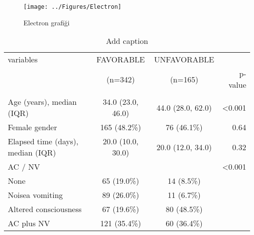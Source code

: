 \newpage
\pagestyle{fancy}
\begin{figure}[htpn]
\centering
\texttt{[image: ../Figures/Electron]}
\caption[elect2]{Electron grafiği}
\label{fig:Electr}
\end{figure}
\newpage
\pagestyle{plain}
\begin{landscape}
 \begin{table}[htbp]
   \centering
   \caption{Add caption}
     \begin{tabular}{lccr}
     	\toprule
     	variables                                     &     FAVORABLE     & UNFAVORABLE \tablefootnote{dfıjreıo} &  \\
     	                                              &      (n=342)      &               (n=165)                &              p-value \\ \midrule
     	\multicolumn{1}{c}{}                          &                   &                                      & \multicolumn{1}{c}{} \\
     	Age (years), median (IQR)                     & 34.0 (23.0, 46.0) &          44.0 (28.0, 62.0)           &               <0.001 \\
     	Female gender                                 &   165 (48.2\%)    &             76 (46.1\%)              &                 0.64 \\
     	Elapsed time (days), median (IQR)             & 20.0 (10.0, 30.0) &          20.0 (12.0, 34.0)           &                 0.32 \\
     	AC / NV                                       &                   &                                      &               <0.001 \\
     	None                                          &    65 (19.0\%)    &              14 (8.5\%)              &  \\
     	Noisea vomiting \tablefootnote{bulantı kusma} &    89 (26.0\%)    &              11 (6.7\%)              &  \\
     	Altered consciousness                         &    67 (19.6\%)    &             80 (48.5\%)              &  \\
     	AC plus NV                                    &   121 (35.4\%)    &             60 (36.4\%)              &  \\

\end{tabular}
\end{table}
\end{landscape}
